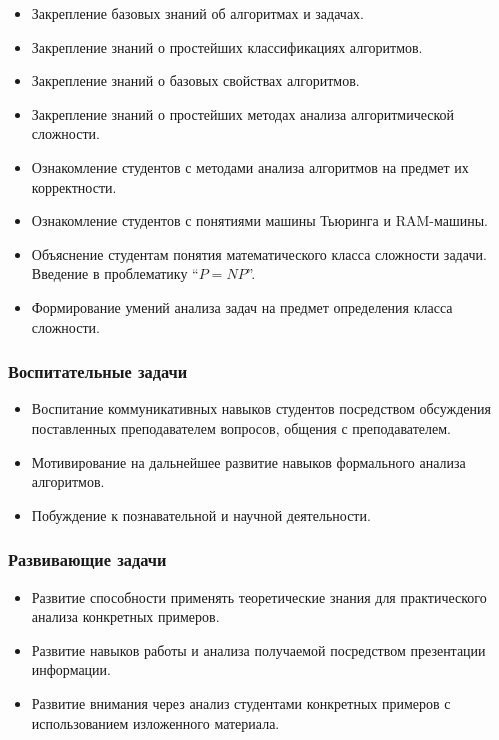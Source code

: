 \documentclass[compress, 9pt]{beamer}
\begin{document}
\begin{refsection}
\begin{frame}
        \begin{itemize}\justifying
            \item Закрепление базовых знаний об алгоритмах и задачах.
            \item Закрепление знаний о простейших классификациях алгоритмов.
            \item Закрепление знаний о базовых свойствах алгоритмов.
            \item Закрепление знаний о простейших методах анализа алгоритмической сложности.
            \item Ознакомление студентов с методами анализа алгоритмов на предмет их корректности.
            \item Ознакомление студентов с понятиями машины Тьюринга и RAM-машины.
            \item Объяснение студентам понятия математического класса сложности задачи. Введение в проблематику \enquote{$P = NP$}.
            \item Формирование умений анализа задач на предмет определения класса сложности.
        \end{itemize}

    \end{frame}

    \begin{frame}\frametitle{Воспитательные задачи}

        \begin{itemize}\justifying
            \item Воспитание коммуникативных навыков студентов посредством обсуждения поставленных преподавателем вопросов, общения с преподавателем.
            \item Мотивирование на дальнейшее развитие навыков формального анализа алгоритмов.
            \item Побуждение к познавательной и научной деятельности.
        \end{itemize}

    \end{frame}

    \begin{frame}\frametitle{Развивающие задачи}

        \begin{itemize}\justifying
            \item Развитие способности применять теоретические знания для практического анализа конкретных примеров.
            \item Развитие навыков работы и анализа получаемой посредством презентации информации.
            \item Развитие внимания через анализ студентами конкретных примеров с использованием изложенного материала.
        \end{itemize}


\end{frame}
\end{refsection}
\end{document}
